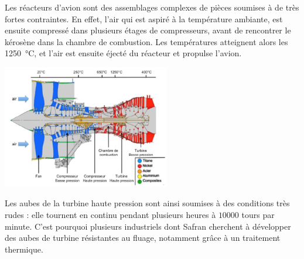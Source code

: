 
Les réacteurs d'avion sont des assemblages complexes de pièces soumises à de
très fortes contraintes. En effet, l'air qui est aspiré à la température 
ambiante, est ensuite compressé dans plusieurs étages de compresseurs, 
avant de rencontrer le kérosène dans la chambre de combustion. Les températures
atteignent alors les \SI{1250}{\celsius}, et l'air est ensuite éjecté du réacteur
et propulse l'avion.


\centerline{\includegraphics[width=0.55\textwidth]{images/coupe_CFM56.png}}


Les aubes de la turbine haute pression sont ainsi soumises à des conditions très rudes : elle tournent en continu pendant plusieurs heures à $10000$ tours par minute. C'est pourquoi plusieurs industriels dont Safran cherchent à développer des aubes de turbine résistantes au fluage, notamment grâce à un traitement thermique.


